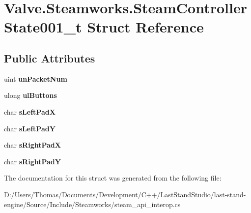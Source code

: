 \hypertarget{structValve_1_1Steamworks_1_1SteamControllerState001__t}{}\section{Valve.\+Steamworks.\+Steam\+Controller\+State001\+\_\+t Struct Reference}
\label{structValve_1_1Steamworks_1_1SteamControllerState001__t}
\subsection*{Public Attributes}
\begin{DoxyCompactItemize}
\item 
\hypertarget{structValve_1_1Steamworks_1_1SteamControllerState001__t_a1615d0d5e81505fa996fcbf8183c6954}{}uint {\bfseries un\+Packet\+Num}\label{structValve_1_1Steamworks_1_1SteamControllerState001__t_a1615d0d5e81505fa996fcbf8183c6954}

\item 
\hypertarget{structValve_1_1Steamworks_1_1SteamControllerState001__t_af922eed63d9e2adb58fefe25548c426a}{}ulong {\bfseries ul\+Buttons}\label{structValve_1_1Steamworks_1_1SteamControllerState001__t_af922eed63d9e2adb58fefe25548c426a}

\item 
\hypertarget{structValve_1_1Steamworks_1_1SteamControllerState001__t_a21761f8b666eb10ddb60438e43709c9c}{}char {\bfseries s\+Left\+Pad\+X}\label{structValve_1_1Steamworks_1_1SteamControllerState001__t_a21761f8b666eb10ddb60438e43709c9c}

\item 
\hypertarget{structValve_1_1Steamworks_1_1SteamControllerState001__t_a720de57011efbf5589e74aff14957a3f}{}char {\bfseries s\+Left\+Pad\+Y}\label{structValve_1_1Steamworks_1_1SteamControllerState001__t_a720de57011efbf5589e74aff14957a3f}

\item 
\hypertarget{structValve_1_1Steamworks_1_1SteamControllerState001__t_a19f5174ffcc08bd30f5aed9c05620036}{}char {\bfseries s\+Right\+Pad\+X}\label{structValve_1_1Steamworks_1_1SteamControllerState001__t_a19f5174ffcc08bd30f5aed9c05620036}

\item 
\hypertarget{structValve_1_1Steamworks_1_1SteamControllerState001__t_a377bccf99a572bebe243c4e50402b15e}{}char {\bfseries s\+Right\+Pad\+Y}\label{structValve_1_1Steamworks_1_1SteamControllerState001__t_a377bccf99a572bebe243c4e50402b15e}

\end{DoxyCompactItemize}


The documentation for this struct was generated from the following file\+:\begin{DoxyCompactItemize}
\item 
D\+:/\+Users/\+Thomas/\+Documents/\+Development/\+C++/\+Last\+Stand\+Studio/last-\/stand-\/engine/\+Source/\+Include/\+Steamworks/steam\+\_\+api\+\_\+interop.\+cs\end{DoxyCompactItemize}
